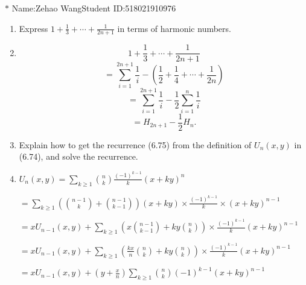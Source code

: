 \documentclass[12pt,a4paper]{article}
\makeatletter
\newtheorem*{solution}{Solution}
\theoremstyle{definition}
\renewenvironment{solution}[1][Solution] {\par\pushQED{\qed}\normalfont\topsep6\p@\@plus6\p@\relax\trivlist\item[\hskip\labelsep\bfseries#1\@addpunct{.}]\ignorespaces}{\popQED\endtrivlist\@endpefalse} \makeatother
\makeatother
\begin{document}
\noindent

\noindent{}
\begin{center}
\footnotesize{\color{blue}$*$ Name:Zehao Wang\quad Student ID:518021910976}
\end{center}

\begin{enumerate}
    \item 
        Express $1+\frac{1}{3}+\cdots+\frac{1}{2n+1}$ in terms of harmonic numbers.
        \begin{solution}
        	\begin{equation*}
        	    1+\frac{1}{3}+\cdots+\frac{1}{2n+1}
        	\end{equation*}
        	\begin{equation*}
        	    =\sum_{i=1}^{2n+1} \frac{1}{i}-(\frac{1}{2}+\frac{1}{4}+\cdots+\frac{1}{2n})
        	\end{equation*}
        	\begin{equation*}
        	    =\sum_{i=1}^{2n+1}\frac{1}{i}-\frac{1}{2}\sum_{i=1}^{n} \frac{1}{i}
        	\end{equation*}
        	\begin{equation*}
        	    =H_{2n+1}-\frac{1}{2}H_{n}.
        	\end{equation*}
        \end{solution}
    \item 
        Explain how to get the recurrence (6.75) from the definition of $U_n(x,y)$ in (6.74), and solve the recurrence.
        \begin{solution}
        	$U_n(x,y)=\sum_{k \ge 1}\binom{n}{k} \frac{(-1)^{k-1}}{k} (x+ky)^n$
        	
        	$=\sum_{k \ge 1}(\binom{n-1}{k}+\binom{n-1}{k-1})(x+ky)\times\frac{(-1)^{k-1}}{k}\times(x+ky)^{n-1}$
        	
        	$=xU_{n-1}(x,y)+\sum_{k \ge 1}(x\binom{n-1}{k-1}+ky\binom{n}{k})\times\frac{(-1)^{k-1}}{k}(x+ky)^{n-1}$
        	
        	$=xU_{n-1}(x,y)+\sum_{k \ge 1}(\frac{kx}{n}\binom{n}{k}+ky\binom{n}{k})\times\frac{(-1)^{k-1}}{k}(x+ky)^{n-1}$
        	
        	$=xU_{n-1}(x,y)+(y+\frac{x}{n})\sum_{k \ge 1}\binom{n}{k}(-1)^{k-1}(x+ky)^{n-1}$
        	

\end{solution}
\end{enumerate}
\end{document}
